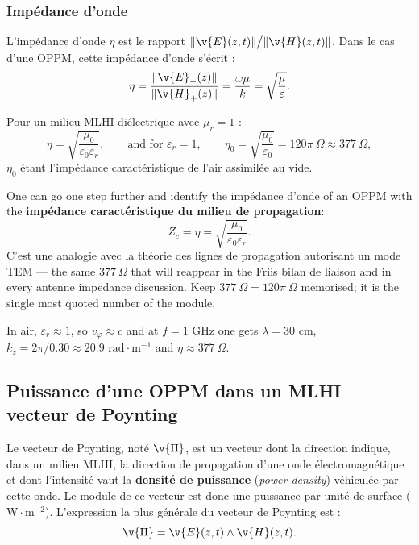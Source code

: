 \subsubsection{Impédance d'onde}

\begin{definition}
  L'impédance d'onde $\eta$ est le rapport
  $\|\v{E}(z,t)\| \big/ \|\v{H}(z,t)\|$. Dans le cas d'une OPPM, cette
  impédance d'onde s'écrit :
  \[
    \eta = \frac{\|\v{E}_+(z)\|}{\|\v{H}_+(z)\|}
         = \frac{\omega\mu}{k}
         = \sqrt{\frac{\mu}{\varepsilon}}.
  \]
\end{definition}

Pour un milieu MLHI diélectrique avec $\mu_r = 1$ :
\[
  \eta = \sqrt{\frac{\mu_0}{\varepsilon_0\varepsilon_r}},
  \qquad\text{and for }\varepsilon_r = 1,\qquad
  \eta_0 = \sqrt{\frac{\mu_0}{\varepsilon_0}} = 120\pi\ \Omega \approx 377\ \Omega,
\]
$\eta_0$ étant l'impédance caractéristique de l'air assimilée au vide.

\begin{remark}
  One can go one step further and identify the impédance d'onde of an OPPM
  with the \textbf{impédance caractéristique du milieu de propagation}:
  \[
    Z_c = \eta = \sqrt{\frac{\mu_0}{\varepsilon_0\varepsilon_r}}.
  \]
  C'est une analogie avec la théorie des lignes de propagation autorisant un
  mode TEM --- the same $377\ \Omega$ that will reappear in the Friis bilan de
  liaison and in every antenne impedance discussion. Keep
  $377\ \Omega = 120\pi\ \Omega$ memorised; it is the single most quoted number
  of the module.
\end{remark}

\begin{example}
  In air, $\varepsilon_r \approx 1$, so $v_\varphi \approx c$ and at $f = 1$ GHz
  one gets $\lambda = 30$ cm, $k_z = 2\pi/0.30 \approx 20.9$
  $\text{rad}\cdot\text{m}^{-1}$ and $\eta \approx 377\ \Omega$.
\end{example}

\subsection{Puissance d'une OPPM dans un MLHI --- vecteur de Poynting}

\begin{definition}
  Le vecteur de Poynting, noté $\v{\Pi}$, est un vecteur dont la direction
  indique, dans un milieu MLHI, la direction de propagation d'une onde
  électromagnétique et dont l'intensité vaut la \textbf{densité de puissance}
  (\textit{power density}) véhiculée par cette onde. Le module de ce vecteur
  est donc une puissance par unité de surface ($\text{W}\cdot\text{m}^{-2}$).
  L'expression la plus générale du vecteur de Poynting est :
  \[
    \v{\Pi} = \v{E}(z,t) \wedge \v{H}(z,t).
  \]
\end{definition}

